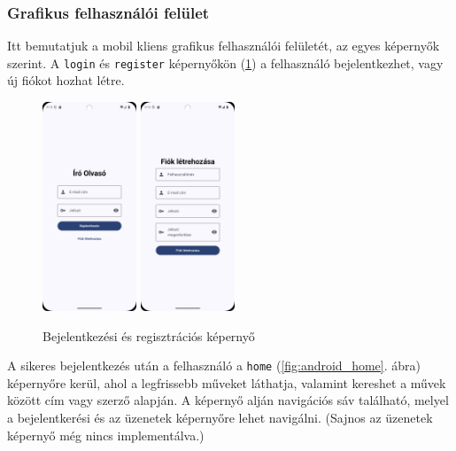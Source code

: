 \subsubsection{Grafikus felhasználói felület}
Itt bemutatjuk a mobil kliens grafikus felhasználói felületét, az egyes képernyők szerint.
A \texttt{login} és \texttt{register} képernyőkön (\ref{fig:android_login}) a felhasználó bejelentkezhet, vagy új fiókot hozhat létre.
\begin{figure}[H]
    \centering
    \includegraphics[width=0.25\textwidth]{figures/android_login.png}
    \includegraphics[width=0.25\textwidth]{figures/android_register.png}
    \caption{Bejelentkezési és regisztrációs képernyő}
    \label{fig:android_login}
\end{figure}

A sikeres bejelentkezés után a felhasználó a \texttt{home}  (\ref{fig:android_home}. ábra) képernyőre kerül, 
ahol a legfrissebb műveket láthatja, valamint kereshet a művek között cím vagy szerző alapján.
A képernyő alján navigációs sáv található, melyel a bejelentkerési és az üzenetek képernyőre lehet navigálni. 
(Sajnos az üzenetek képernyő még nincs implementálva.)


